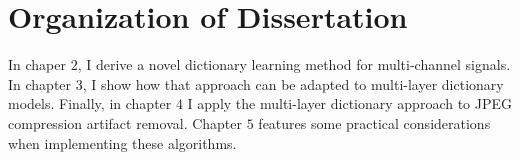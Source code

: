 \section{Organization of Dissertation}
In chaper $2$, I derive a novel dictionary learning method for multi-channel signals. In chapter $3$, I show how that approach can be adapted to multi-layer dictionary models.  Finally, in chapter $4$ I apply the multi-layer dictionary approach to JPEG compression artifact removal. Chapter $5$ features some practical considerations when implementing these algorithms.




